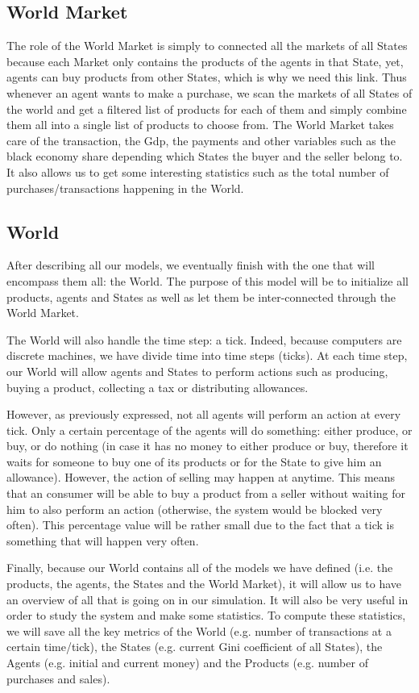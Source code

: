 \subsection{World Market}\label{section:WorldMarket}
The role of the World Market is simply to connected all the markets of all States because each Market only contains the products of the agents in that State, yet, agents can buy products from other States, which is why we need this link. Thus whenever an agent wants to make a purchase, we scan the markets of all States of the world and get a filtered list of products for each of them and simply combine them all into a single list of products to choose from. The World Market takes care of the transaction, the Gdp, the payments and other variables such as the black economy share depending which States the buyer and the seller belong to. It also allows us to get some interesting statistics such as the total number of purchases/transactions happening in the World.


\subsection{World}\label{section:world}
After describing all our models, we eventually finish with the one that will encompass them all: the World. The purpose of this model will be to initialize all products, agents and States as well as let them be inter-connected through the World Market.

The World will also handle the time step: a tick. Indeed, because computers are discrete machines, we have divide time into time steps (ticks). At each time step, our World will allow agents and States to perform actions such as producing, buying a product, collecting a tax or distributing allowances.

However, as previously expressed, not all agents will perform an action at every tick. Only a certain percentage of the agents will do something: either produce, or buy, or do nothing (in case it has no money to either produce or buy, therefore it waits for someone to buy one of its products or for the State to give him an allowance). However, the action of selling may happen at anytime. This means that an consumer will be able to buy a product from a seller without waiting for him to also perform an action (otherwise, the system would be blocked very often).
This percentage value will be rather small due to the fact that a tick is something that will happen very often.

Finally, because our World contains all of the models we have defined (i.e. the products, the agents, the States and the World Market), it will allow us to have an overview of all that is going on in our simulation. It will also be very useful in order to study the system and make some statistics. To compute these statistics, we will save all the key metrics of the World (e.g. number of transactions at a certain time/tick), the States (e.g. current Gini coefficient of all States), the Agents (e.g. initial and current money) and the Products (e.g. number of purchases and sales). 

